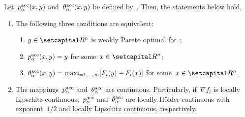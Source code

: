 \documentclass[../main]{subfiles}
\begin{document}
\begin{proposition} 
    Let~$p^{\mathrm{acc}}_\alpha(x, y)$ and~$\theta^{\mathrm{acc}}_\alpha(x, y)$ be defined by~.
    Then, the statements below hold.
    \begin{enumerate}
        \item The following three conditions are equivalent:
              \begin{enumerate}
                  \item $y \in \setR^n$ is weakly Pareto optimal for~; 
                  \item $p^{\mathrm{acc}}_\alpha(x, y) = y$ for some~$x \in \setR^n$; 
                  \item $\theta^{\mathrm{acc}}_\alpha(x, y) = \max_{i = 1, \dots, m} [ F_i(y) - F_i(x) ]$ for some~$x \in \setR^n$. 
              \end{enumerate}
        \item The mappings~$p^{\mathrm{acc}}_\alpha$ and~$\theta^{\mathrm{acc}}_\alpha$ are continuous.
              Particularly, if~$\nabla f_i$ is locally Lipschitz continuous,~$p^{\mathrm{acc}}_\alpha$ and~$\theta^{\mathrm{acc}}_\alpha$ are locally H\"older continuous with exponent~$1 / 2$ and locally Lipschitz continuous, respectively. 
    \end{enumerate}
\end{proposition}
\end{document}
